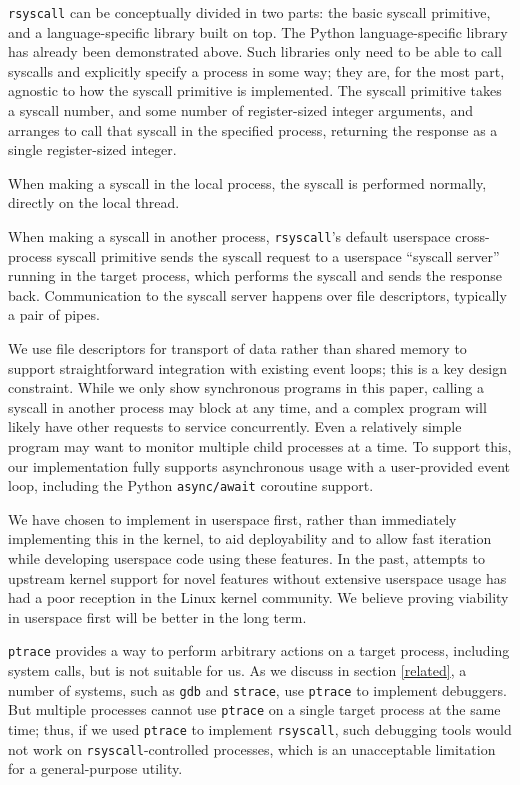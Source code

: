 \documentclass[letterpaper,twocolumn,10pt]{article}
\begin{document}
\texttt{rsyscall} can be conceptually divided in two parts:
the basic syscall primitive,
and a language-specific library built on top.
The Python language-specific library has already been demonstrated above.
Such libraries only need to be able to call syscalls and explicitly specify a process in some way;
they are, for the most part, agnostic to how the syscall primitive is implemented.
The syscall primitive takes a syscall number, and some number of register-sized integer arguments,
and arranges to call that syscall in the specified process,
returning the response as a single register-sized integer.

When making a syscall in the local process, the syscall is performed normally,
directly on the local thread.

When making a syscall in another process,
\texttt{rsyscall}'s default userspace cross-process syscall primitive sends the syscall request
to a userspace ``syscall server'' running in the target process,
which performs the syscall and sends the response back.
Communication to the syscall server happens over file descriptors,
typically a pair of pipes.

We use file descriptors for transport of data rather than shared memory
to support straightforward integration with existing event loops;
this is a key design constraint.
While we only show synchronous programs in this paper,
calling a syscall in another process may block at any time,
and a complex program will likely have other requests to service concurrently.
Even a relatively simple program may want to monitor multiple child processes at a time.
To support this,
our implementation fully supports asynchronous usage with a user-provided event loop,
including the Python \texttt{async/await} coroutine support\cite{python_coroutines}.

We have chosen to implement in userspace first,
rather than immediately implementing this in the kernel,
to aid deployability
and to allow fast iteration while developing userspace code using these features.
In the past, attempts to upstream kernel support for novel features without extensive userspace usage
has had a poor reception in the Linux kernel community\cite{lwn_checkpoint}\cite{first_class_address_space}.
We believe proving viability in userspace first will be better in the long term.

\texttt{ptrace} provides a way to perform arbitrary actions on a target process,
including system calls,
but is not suitable for us\cite{ptrace}.
As we discuss in section \ref{related}, a number of systems, such as \texttt{gdb} and \texttt{strace},
use \texttt{ptrace} to implement debuggers.
But multiple processes cannot use \texttt{ptrace} on a single target process at the same time;
thus, if we used \texttt{ptrace} to implement \texttt{rsyscall},
such debugging tools would not work on \texttt{rsyscall}-controlled processes,
which is an unacceptable limitation for a general-purpose utility.
\end{document}
